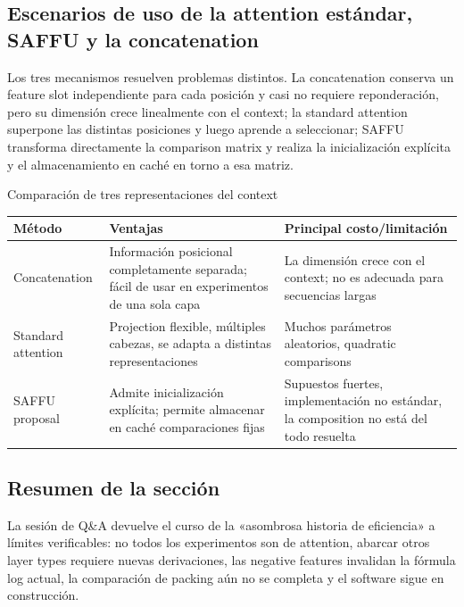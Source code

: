 \documentclass[a4paper]{article}
\begin{document}

\subsection{Escenarios de uso de la attention estándar, SAFFU y la concatenation}

Los tres mecanismos resuelven problemas distintos. La concatenation conserva un feature slot independiente para cada posición y casi no requiere reponderación, pero su dimensión crece linealmente con el context; la standard attention superpone las distintas posiciones y luego aprende a seleccionar; SAFFU transforma directamente la comparison matrix y realiza la inicialización explícita y el almacenamiento en caché en torno a esa matriz.

\begin{knowledgebox}{Comparación de tres representaciones del context}
\begin{tabularx}{\textwidth}{L{0.19\textwidth} L{0.25\textwidth} X}
\toprule
Método & Ventajas & Principal costo/limitación \\
\midrule
Concatenation & Información posicional completamente separada; fácil de usar en experimentos de una sola capa & La dimensión crece con el context; no es adecuada para secuencias largas \\
Standard attention & Projection flexible, múltiples cabezas, se adapta a distintas representaciones & Muchos parámetros aleatorios, quadratic comparisons \\
SAFFU proposal & Admite inicialización explícita; permite almacenar en caché comparaciones fijas & Supuestos fuertes, implementación no estándar, la composition no está del todo resuelta \\
\bottomrule
\end{tabularx}
\end{knowledgebox}

\subsection{Resumen de la sección}

La sesión de Q\&A devuelve el curso de la «asombrosa historia de eficiencia» a límites verificables: no todos los experimentos son de attention, abarcar otros layer types requiere nuevas derivaciones, las negative features invalidan la fórmula log actual, la comparación de packing aún no se completa y el software sigue en construcción.
\end{document}
